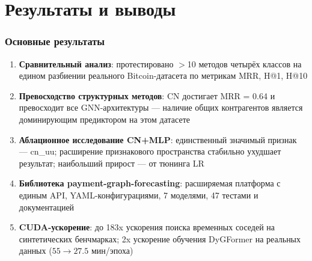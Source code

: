 \documentclass[aspectratio=169]{beamer}
\begin{document}
\section{Результаты и выводы}
\begin{frame}
  \frametitle{Основные результаты}
  \begin{enumerate}
    \item \textbf{Сравнительный анализ}: протестировано $>$10 методов четырёх классов на едином разбиении реального Bitcoin-датасета по метрикам MRR, H@1, H@10
    \vspace{0.2cm}
    \item \textbf{Превосходство структурных методов}: CN достигает MRR = 0.64 и превосходит все GNN-архитектуры — наличие общих контрагентов является доминирующим предиктором на этом датасете
    \vspace{0.2cm}
    \item \textbf{Аблационное исследование CN+MLP}: единственный значимый признак — cn\_uu; расширение признакового пространства стабильно ухудшает результат; наибольший прирост — от тюнинга LR
    \vspace{0.2cm}
    \item \textbf{Библиотека payment-graph-forecasting}: расширяемая платформа с единым API, YAML-конфигурациями, 7 моделями, 47 тестами и документацией
    \vspace{0.2cm}
    \item \textbf{CUDA-ускорение}: до 183x ускорения поиска временных соседей на синтетических бенчмарках; 2x ускорение обучения DyGFormer на реальных данных ($55 \to 27.5$ мин/эпоха)
  \end{enumerate}
\end{frame}

\end{document}
